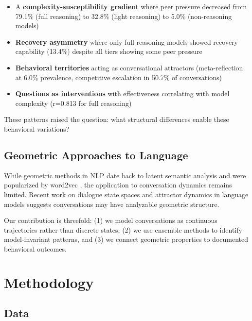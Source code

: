 \documentclass[11pt,letterpaper]{article}
\newcommand{\fullReasoningPeerPressure}{79.1\%}
\newcommand{\lightReasoningPeerPressure}{32.8\%}
\newcommand{\nonReasoningPeerPressure}{5.0\%}
\newcommand{\fullReasoningRecovery}{13.4\%}
\newcommand{\fullQuestionR}{0.813}
\newcommand{\metaReflectionPrevalence}{6.0\%}
\newcommand{\competitiveEscalationPrevalence}{50.7\%}
\begin{document}
\begin{itemize}
\item A \textbf{complexity-susceptibility gradient} where peer pressure decreased from \fullReasoningPeerPressure{} (full reasoning) to \lightReasoningPeerPressure{} (light reasoning) to \nonReasoningPeerPressure{} (non-reasoning models)
\item \textbf{Recovery asymmetry} where only full reasoning models showed recovery capability (\fullReasoningRecovery{}) despite all tiers showing some peer pressure
\item \textbf{Behavioral territories} acting as conversational attractors (meta-reflection at \metaReflectionPrevalence{} prevalence, competitive escalation in \competitiveEscalationPrevalence{} of conversations)
\item \textbf{Questions as interventions} with effectiveness correlating with model complexity (r=\fullQuestionR{} for full reasoning)
\end{itemize}

These patterns raised the question: what structural differences enable these behavioral variations?

\subsection{Geometric Approaches to Language}

While geometric methods in NLP date back to latent semantic analysis \citep{landauer1997solution} and were popularized by word2vec \citep{mikolov2013distributed}, the application to conversation dynamics remains limited. Recent work on dialogue state spaces \citep{brinberg2024state} and attractor dynamics in language models \citep{wang2025attractor} suggests conversations may have analyzable geometric structure.

Our contribution is threefold: (1) we model conversations as continuous trajectories rather than discrete states, (2) we use ensemble methods to identify model-invariant patterns, and (3) we connect geometric properties to documented behavioral outcomes.

\section{Methodology}

\subsection{Data}
\end{document}

